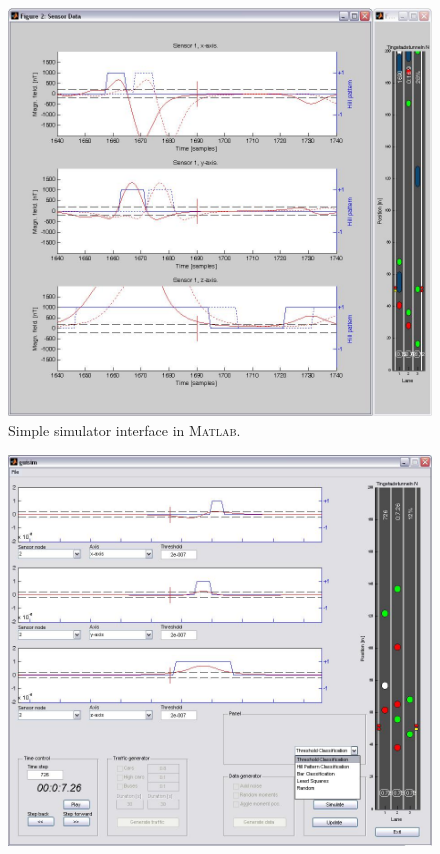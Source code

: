 \begin{subfigures}
\begin{figure}
 \centering
 \begin{minipage}{0.8\linewidth}
 \centering
  
  \includegraphics[width=1\linewidth]{images/screen1}
 \caption[Simple simulator interface screenshot]{Simple simulator interface in \textsc{Matlab}.}
 \label{fig:screen1}
 \end{minipage}
 \end{figure}
 \begin{figure}
 \begin{minipage}{0.8\linewidth}
 \centering
 
  \includegraphics[width=1\linewidth]{images/screen2}

\end{minipage}
\end{figure}
\end{subfigures}
